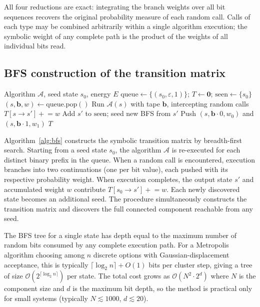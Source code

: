 \documentclass[twocolumn,10pt]{article}
\begin{document}
All four reductions are exact: integrating the branch weights over all bit
sequences recovers the original probability measure of each random call.
Calls of each type may be combined arbitrarily within a single algorithm
execution; the symbolic weight of any complete path is the product of the
weights of all individual bits read.

\subsection{BFS construction of the transition matrix}
\label{sec:bfs}

\begin{algorithm}[t]
\caption{Symbolic transition-matrix construction (BFS)}
\label{alg:bfs}
\begin{algorithmic}[1]
\Require Algorithm $\mathcal{A}$, seed state $s_0$, energy $E$
\State $\mathrm{queue}\leftarrow\{(s_0,\varepsilon,1)\}$;\;
       $T\leftarrow\mathbf{0}$;\;
       $\mathrm{seen}\leftarrow\{s_0\}$
  \State $(s,\mathbf{b},w)\leftarrow\mathrm{queue.pop}()$
  \State Run $\mathcal{A}(s)$ with tape $\mathbf{b}$, intercepting random calls
    \State $T[s\to s']\mathrel{+}=w$
      \State Add $s'$ to $\mathrm{seen}$;\; seed new BFS from $s'$
    \EndIf
    \State Push $(s,\mathbf{b}{\cdot}0,w_0)$ and $(s,\mathbf{b}{\cdot}1,w_1)$
  \EndIf
\EndWhile
\State \Return $T$
\end{algorithmic}
\end{algorithm}

Algorithm~\ref{alg:bfs} constructs the symbolic transition matrix by
breadth-first search.  Starting from a seed state $s_0$, the algorithm
$\mathcal{A}$ is re-executed for each distinct binary prefix in the queue.
When a random call is encountered, execution branches into two continuations
(one per bit value), each pushed with its respective probability weight.
When execution completes, the output state $s'$ and accumulated weight $w$
contribute $T[s_0\to s']\mathrel{+}=w$.  Each newly discovered state
becomes an additional seed.  The procedure simultaneously constructs the
transition matrix and discovers the full connected component reachable from
any seed.

The BFS tree for a single state has depth equal to the maximum number of
random bits consumed by any complete execution path.  For a Metropolis
algorithm choosing among $n$ discrete options with Gaussian-displacement
acceptance, this is typically $\lceil\log_2 n\rceil + O(1)$ bits per
cluster step, giving a tree of size $\mathcal{O}(2^{\lceil\log_2 n\rceil})$
per state.  The total cost grows as $\mathcal{O}(N^2\cdot 2^d)$ where $N$
is the component size and $d$ is the maximum bit depth, so the method is
practical only for small systems (typically $N\lesssim 1000$, $d\lesssim 20$).
\end{document}
